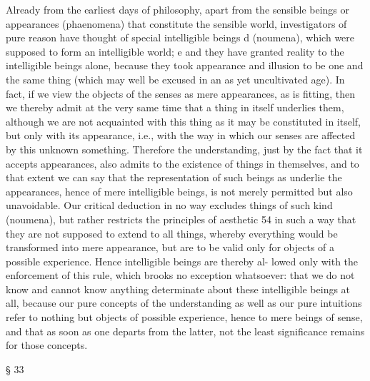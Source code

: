 Already from the earliest days of philosophy, apart from the sensible
beings or appearances (phaenomena) that constitute the sensible world,
investigators of pure reason have thought of special intelligible beings d
(noumena), which were supposed to form an intelligible world; e and they
have granted reality to the intelligible beings alone, because they took
appearance and illusion to be one and the same thing (which may well
be excused in an as yet uncultivated age).
In fact, if we view the objects of the senses as mere appearances, as is
ﬁtting, then we thereby admit at the very same time that a thing in itself
underlies them, although we are not acquainted with this thing as it may
be constituted in itself, but only with its appearance, i.e., with the way in
which our senses are affected by this unknown something. Therefore the
understanding, just by the fact that it accepts appearances, also admits to
the existence of things in themselves, and to that extent we can say that
the representation of such beings as underlie the appearances, hence of
mere intelligible beings, is not merely permitted but also unavoidable.
Our critical deduction in no way excludes things of such kind
(noumena), but rather restricts the principles of aesthetic 54 in such a way
that they are not supposed to extend to all things, whereby everything
would be transformed into mere appearance, but are to be valid only for
objects of a possible experience. Hence intelligible beings are thereby al-
lowed only with the enforcement of this rule, which brooks no exception
whatsoever: that we do not know and cannot know anything determinate
about these intelligible beings at all, because our pure concepts of the
understanding as well as our pure intuitions refer to nothing but objects
of possible experience, hence to mere beings of sense, and that as soon as
one departs from the latter, not the least signiﬁcance remains for those
concepts.

§ 33

